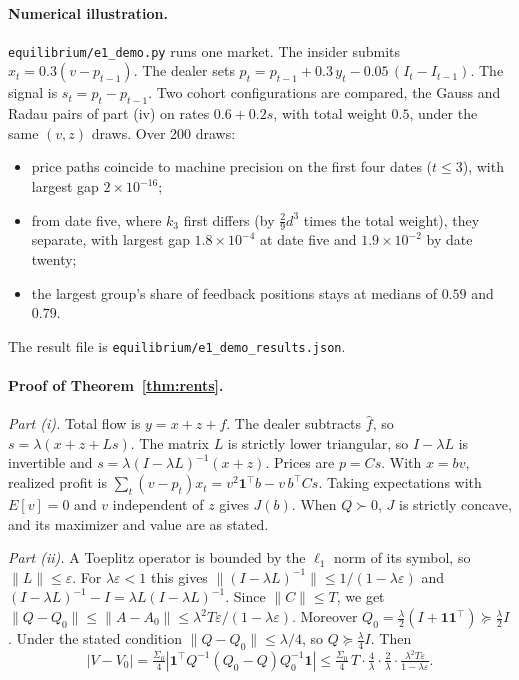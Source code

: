 \paragraph{Numerical illustration.} \nolinkurl{equilibrium/e1_demo.py} runs one market. The insider submits $x_t=0.3(v-p_{t-1})$. The dealer sets $p_t=p_{t-1}+0.3\,y_t-0.05\,(I_t-I_{t-1})$. The signal is $s_t=p_t-p_{t-1}$. Two cohort configurations are compared, the Gauss and Radau pairs of part (iv) on rates $0.6+0.2s$, with total weight $0.5$, under the same $(v,z)$ draws. Over 200 draws:
\begin{itemize}[itemsep=1pt,topsep=2pt]
\item price paths coincide to machine precision on the first four dates ($t\le3$), with largest gap $2\times10^{-16}$;
\item from date five, where $k_3$ first differs (by $\tfrac29d^3$ times the total weight), they separate, with largest gap $1.8\times10^{-4}$ at date five and $1.9\times10^{-2}$ by date twenty;
\item the largest group's share of feedback positions stays at medians of $0.59$ and $0.79$.
\end{itemize}
The result file is \nolinkurl{equilibrium/e1_demo_results.json}.

\paragraph{Proof of Theorem~\ref{thm:rents}.}
\emph{Part (i).} Total flow is $y=x+z+f$. The dealer subtracts $\hat f$, so $s=\lambda(x+z+Ls)$. The matrix $L$ is strictly lower triangular, so $I-\lambda L$ is invertible and $s=\lambda(I-\lambda L)^{-1}(x+z)$. Prices are $p=Cs$. With $x=bv$, realized profit is $\sum_t(v-p_t)x_t=v^2\mathbf1^\top b-v\,b^\top Cs$. Taking expectations with $E[v]=0$ and $v$ independent of $z$ gives $J(b)$. When $Q\succ0$, $J$ is strictly concave, and its maximizer and value are as stated.

\emph{Part (ii).} A Toeplitz operator is bounded by the $\ell_1$ norm of its symbol, so $\|L\|\le\varepsilon$. For $\lambda\varepsilon<1$ this gives $\|(I-\lambda L)^{-1}\|\le1/(1-\lambda\varepsilon)$ and $(I-\lambda L)^{-1}-I=\lambda L(I-\lambda L)^{-1}$. Since $\|C\|\le T$, we get $\|Q-Q_0\|\le\|A-A_0\|\le\lambda^2T\varepsilon/(1-\lambda\varepsilon)$. Moreover $Q_0=\tfrac\lambda2(I+\mathbf1\mathbf1^\top)\succeq\tfrac\lambda2I$. Under the stated condition $\|Q-Q_0\|\le\lambda/4$, so $Q\succeq\tfrac\lambda4I$. Then
\[
|V-V_0|=\tfrac{\Sigma_0}4|\mathbf1^\top Q^{-1}(Q_0-Q)Q_0^{-1}\mathbf1|\le\tfrac{\Sigma_0}4\,T\cdot\tfrac4\lambda\cdot\tfrac2\lambda\cdot\tfrac{\lambda^2T\varepsilon}{1-\lambda\varepsilon}.
\]

